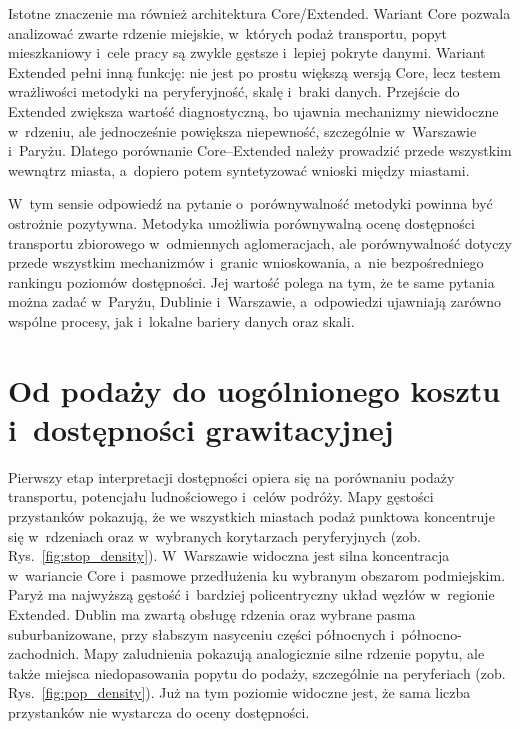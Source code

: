 \documentclass{pracamgr}
\begin{document}
Istotne znaczenie ma również architektura \mbox{Core}/\mbox{Extended}. Wariant \mbox{Core} pozwala analizować zwarte rdzenie miejskie, w~których podaż transportu, popyt mieszkaniowy i~cele pracy są zwykle gęstsze i~lepiej pokryte danymi. Wariant \mbox{Extended} pełni inną funkcję: nie jest po prostu większą wersją \mbox{Core}, lecz testem wrażliwości metodyki na peryferyjność, skalę i~braki danych. Przejście do \mbox{Extended} zwiększa wartość diagnostyczną, bo ujawnia mechanizmy niewidoczne w~rdzeniu, ale jednocześnie powiększa niepewność, szczególnie w~Warszawie i~Paryżu. Dlatego porównanie \mbox{Core--Extended} należy prowadzić przede wszystkim wewnątrz miasta, a~dopiero potem syntetyzować wnioski między miastami.

W~tym sensie odpowiedź na pytanie o~porównywalność metodyki powinna być ostrożnie pozytywna. Metodyka umożliwia porównywalną ocenę dostępności transportu zbiorowego w~odmiennych aglomeracjach, ale porównywalność dotyczy przede wszystkim mechanizmów i~granic wnioskowania, a~nie bezpośredniego rankingu poziomów dostępności. Jej wartość polega na tym, że te same pytania można zadać w~Paryżu, Dublinie i~Warszawie, a~odpowiedzi ujawniają zarówno wspólne procesy, jak i~lokalne bariery danych oraz skali.

\section{Od podaży do uogólnionego kosztu i~dostępności grawitacyjnej}\label{section:ch5_podaz_wtc_grawitacja}

Pierwszy etap interpretacji dostępności opiera się na porównaniu podaży transportu, potencjału ludnościowego i~celów podróży. Mapy gęstości przystanków pokazują, że we wszystkich miastach podaż punktowa koncentruje się w~rdzeniach oraz w~wybranych korytarzach peryferyjnych (zob. Rys.~\ref{fig:stop_density}). W~Warszawie widoczna jest silna koncentracja w~wariancie \mbox{Core} i~pasmowe przedłużenia ku wybranym obszarom podmiejskim. Paryż ma najwyższą gęstość i~bardziej policentryczny układ węzłów w~regionie \mbox{Extended}. Dublin ma zwartą obsługę rdzenia oraz wybrane pasma suburbanizowane, przy słabszym nasyceniu części północnych i~północno-zachodnich. Mapy zaludnienia pokazują analogicznie silne rdzenie popytu, ale także miejsca niedopasowania popytu do podaży, szczególnie na peryferiach (zob. Rys.~\ref{fig:pop_density}). Już na tym poziomie widoczne jest, że sama liczba przystanków nie wystarcza do oceny dostępności.
\end{document}
